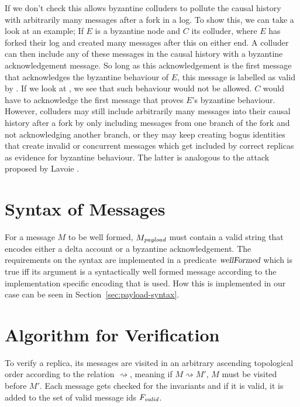 If we don't check  this allows byzantine colluders to pollute the causal history with arbitrarily many messages after a fork in a log. To show this, we can take a look at an example; If $E$ is a byzantine node and $C$ its colluder, where $E$ has forked their log and created many messages after this on either end. A colluder can then include any of these messages in the causal history with a byzantine acknowledgement message. So long as this acknowledgement is the first message that acknowledges the byzantine behaviour of $E$, this message is labelled as valid by . If we look at , we see that such behaviour would not be allowed. $C$ would have to acknowledge the first message that proves $E$'s byzantine behaviour. However, colluders may still include arbitrarily many messages into their causal history after a fork by only including messages from one branch of the fork and not acknowledging another branch, or they may keep creating bogus identities that create invalid or concurrent messages which get included by correct replicas as evidence for byzantine behaviour. The latter is analogous to the attack proposed by Lavoie \cite{blocklace-attack}.

\section{Syntax of Messages}
\label{sec:syntax-of-msgs}
For a message $M$ to be well formed, $M_\emph{payload}$ must contain a valid string that encodes either a delta account or a byzantine acknowledgement. The requirements on the syntax are implemented in a predicate $\textsl{wellFormed}$ which is true iff its argument is a syntactically well formed message according to the implementation specific encoding that is used. How this is implemented in our case can be seen in Section~\ref{sec:payload-syntax}.

\section{Algorithm for Verification}
To verify a replica, its messages are visited in an arbitrary ascending topological order according to the relation $\rightsquigarrow$, meaning if $M \rightsquigarrow M'$, $M$ must be visited before $M'$. Each message gets checked for the invariants and if it is valid, it is added to the set of valid message ids $F_\emph{valid}$.

